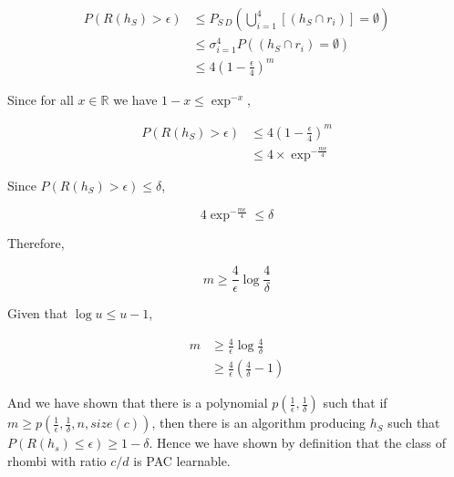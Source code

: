 \begin{equation}
\begin{aligned}
P(R(h_S)>\epsilon) &\leq P_{S~D}( \bigcup_{i=1}^{4}[(h_S \cap r_i)] = \emptyset )\\
&\leq \sigma_{i=1}^{4} P((h_S \cap r_i) = \emptyset)\\
&\leq 4(1 - \frac{\epsilon}{4})^m
\end{aligned}
\end{equation}

Since for all $x \in \mathbb{R}$ we have $1 - x \leq \exp^{-x}$,

\begin{equation}
\begin{aligned}
P(R(h_S)>\epsilon) &\leq 4(1 - \frac{\epsilon}{4})^m\\
&\leq 4 \times \exp^{-\frac{m\epsilon}{4}}
\end{aligned}\label{eq13}
\end{equation}

Since $P(R(h_S) > \epsilon) \leq \delta$,

\begin{equation}\label{eq14}
4\exp^{-\frac{m\epsilon}{4}} \leq \delta
\end{equation}

Therefore,

\begin{equation}\label{eq15}
m \geq \frac{4}{\epsilon} \log \frac{4}{\delta}
\end{equation}

Given that $\log u \leq u - 1$,

\begin{equation}\label{eq16}
\begin{aligned}
m &\geq \frac{4}{\epsilon} \log \frac{4}{\delta}\\
& \geq \frac{4}{\epsilon} (\frac{4}{\delta} - 1)
\end{aligned}
\end{equation}

And we have shown that there is a polynomial $p(\frac{1}{\epsilon}, \frac{1}{\delta})$ such that if $m \geq p(\frac{1}{\epsilon},\frac{1}{\delta},n,size(c))$, then there is an algorithm producing $h_S$ such that $P(R(h_s) \leq \epsilon) \geq 1 - \delta$.
Hence we have shown by definition that the class of rhombi with ratio $c/d$ is PAC learnable.
